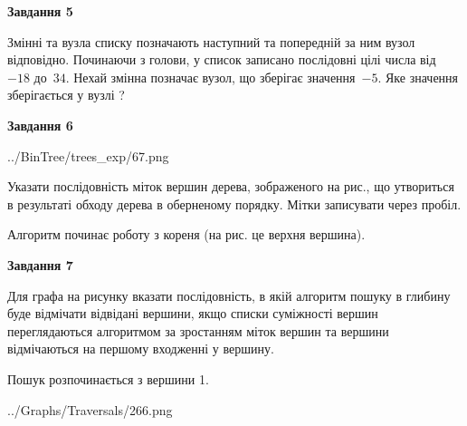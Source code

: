 \documentclass[12pt, ukrainian]{article}
\begin{document}
{\begin {large}
{\begin {center}\textbf{Завдання 5}\end {center}}\par
Змінні  та  вузла списку позначають наступний та попередній за ним вузол відповідно. Починаючи з голови, у список записано послідовні цілі числа від~$-18$ до~$34$. Нехай змінна  позначає вузол, що зберігає значення~$-5$.
Яке значення зберігається у вузлі  ?\par
\newpage

{\begin {center}\textbf{Завдання 6}\end {center}}\par

\begin{center}
	{../BinTree/trees_exp/67.png}
\end{center}
Указати послідовність міток вершин дерева, зображеного на рис., що утвориться в результаті обходу дерева в оберненому порядку. Мітки записувати через пробіл.\par Алгоритм починає роботу з кореня (на рис. це верхня вершина).\par
\newpage

{\begin {center}\textbf{Завдання 7}\end {center}}\par
Для графа на рисунку вказати послідовність, в якій алгоритм пошуку в глибину буде відмічати відвідані вершини, якщо списки суміжності вершин переглядаються алгоритмом за зростанням міток вершин та вершини відмічаються на першому вход\-женні у вершину.\par
Пошук розпочинається з вершини 1.\par

\begin{center}
	{../Graphs/Traversals/266.png}
\end{center}\par
\newpage


\end{large}}
\end{document}
